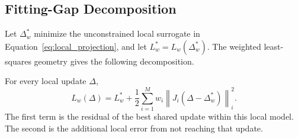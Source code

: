 \subsection{Fitting-Gap Decomposition}
\label{sec:mixture_sensitivity}

Let $\Delta_w^*$ minimize the unconstrained local surrogate in
Equation~\ref{eq:local_projection}, and let $L_w^*=L_w(\Delta_w^*)$.
The weighted least-squares geometry gives the following decomposition.

\begin{proposition}
\label{prop:gap_decomposition}
For every local update $\Delta$,
\begin{equation}
    L_w(\Delta)
    =
    L_w^*
    +
    \frac12\sum_{i=1}^{M}w_i
    \left\|J_i(\Delta-\Delta_w^*)\right\|_i^2.
    \label{eq:gap_decomposition}
\end{equation}
The first term is the residual of the best shared update within this local
model. The second is the additional local error from not reaching that
update.
\end{proposition}

